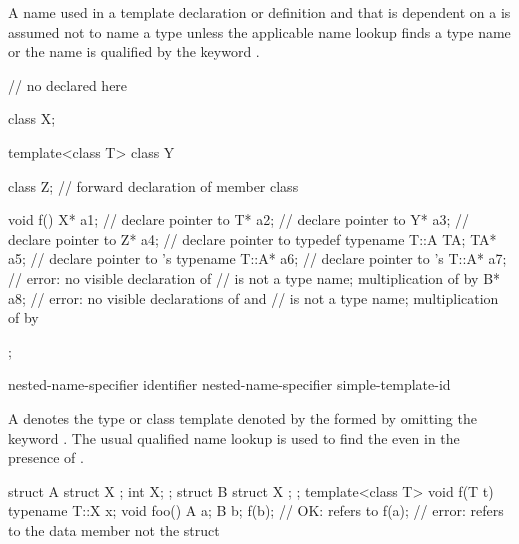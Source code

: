 \pnum
A name used in a template declaration or definition and that is
dependent on a
is assumed not to name a type unless
the applicable name lookup finds a type name or the name
is qualified by the keyword
.
\begin{example}
\begin{codeblock}
// no  declared here

class X;

template<class T> class Y {
  class Z;                      // forward declaration of member class

  void f() {
    X* a1;                      // declare pointer to 
    T* a2;                      // declare pointer to 
    Y* a3;                      // declare pointer to 
    Z* a4;                      // declare pointer to 
    typedef typename T::A TA;
    TA* a5;                     // declare pointer to 's 
    typename T::A* a6;          // declare pointer to 's 
    T::A* a7;                   // error: no visible declaration of 
                                //  is not a type name; multiplication of  by 
    B* a8;                      // error: no visible declarations of  and 
                                //  is not a type name; multiplication of  by 
  }
};
\end{codeblock}
\end{example}

\begin{bnf}
\br
   nested-name-specifier identifier\br
   nested-name-specifier  simple-template-id
\end{bnf}

\pnum
A 
denotes the type or class template
denoted by the 
formed by omitting the keyword .
The usual qualified name lookup is used to find the
even in the presence of
.
\begin{example}
\begin{codeblock}
struct A {
  struct X { };
  int X;
};
struct B {
  struct X { };
};
template<class T> void f(T t) {
  typename T::X x;
}
void foo() {
  A a;
  B b;
  f(b);             // OK:  refers to 
  f(a);             // error:  refers to the data member  not the struct 
}
\end{codeblock}
\end{example}

